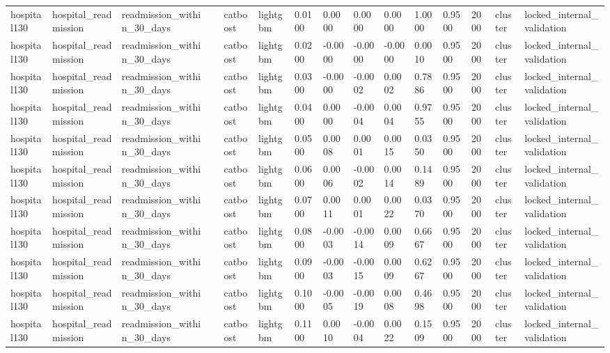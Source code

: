 \begin{tabular}{lllllllllllllll}
hospital130 & hospital\_readmission & readmission\_within\_30\_days &  & catboost & lightgbm & 0.0100 & 0.0000 & 0.0000 & 0.0000 & 1.0000 & 0.9500 & 2000 & cluster & locked\_internal\_validation \\
hospital130 & hospital\_readmission & readmission\_within\_30\_days &  & catboost & lightgbm & 0.0200 & -0.0000 & -0.0000 & -0.0000 & 0.0010 & 0.9500 & 2000 & cluster & locked\_internal\_validation \\
hospital130 & hospital\_readmission & readmission\_within\_30\_days &  & catboost & lightgbm & 0.0300 & -0.0000 & -0.0002 & 0.0002 & 0.7886 & 0.9500 & 2000 & cluster & locked\_internal\_validation \\
hospital130 & hospital\_readmission & readmission\_within\_30\_days &  & catboost & lightgbm & 0.0400 & 0.0000 & -0.0004 & 0.0004 & 0.9755 & 0.9500 & 2000 & cluster & locked\_internal\_validation \\
hospital130 & hospital\_readmission & readmission\_within\_30\_days &  & catboost & lightgbm & 0.0500 & 0.0008 & 0.0001 & 0.0015 & 0.0350 & 0.9500 & 2000 & cluster & locked\_internal\_validation \\
hospital130 & hospital\_readmission & readmission\_within\_30\_days &  & catboost & lightgbm & 0.0600 & 0.0006 & -0.0002 & 0.0014 & 0.1489 & 0.9500 & 2000 & cluster & locked\_internal\_validation \\
hospital130 & hospital\_readmission & readmission\_within\_30\_days &  & catboost & lightgbm & 0.0700 & 0.0011 & 0.0001 & 0.0022 & 0.0370 & 0.9500 & 2000 & cluster & locked\_internal\_validation \\
hospital130 & hospital\_readmission & readmission\_within\_30\_days &  & catboost & lightgbm & 0.0800 & -0.0003 & -0.0014 & 0.0009 & 0.6667 & 0.9500 & 2000 & cluster & locked\_internal\_validation \\
hospital130 & hospital\_readmission & readmission\_within\_30\_days &  & catboost & lightgbm & 0.0900 & -0.0003 & -0.0015 & 0.0009 & 0.6267 & 0.9500 & 2000 & cluster & locked\_internal\_validation \\
hospital130 & hospital\_readmission & readmission\_within\_30\_days &  & catboost & lightgbm & 0.1000 & -0.0005 & -0.0019 & 0.0008 & 0.4698 & 0.9500 & 2000 & cluster & locked\_internal\_validation \\
hospital130 & hospital\_readmission & readmission\_within\_30\_days &  & catboost & lightgbm & 0.1100 & 0.0010 & -0.0004 & 0.0022 & 0.1509 & 0.9500 & 2000 & cluster & locked\_internal\_validation \\

\end{tabular}
